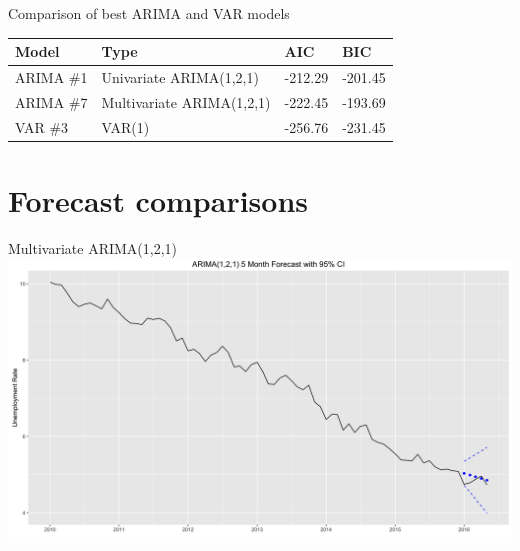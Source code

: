 \documentclass[ignorenonframetext]{beamer}
\begin{document}
  	\begin{frame}{Comparison of best ARIMA and VAR models}
\begin{table}[htb]
\begin{tabular}{llll}
  \hline
Model & Type & AIC & BIC \\ 
  \hline
ARIMA \#1 & Univariate ARIMA(1,2,1) &   -212.29 & -201.45  \\ 
ARIMA \#7 & Multivariate ARIMA(1,2,1)  & -222.45 & -193.69   \\ 
VAR \#3 & VAR(1) & -256.76 & -231.45 \\ 
   \hline
\end{tabular}
\end{table}
  	\end{frame}
 
 
 \section{Forecast comparisons}
 
  	\begin{frame}{Multivariate ARIMA(1,2,1)}
  		 \includegraphics[width=\linewidth]{images/ARIMApred}
  	\end{frame}
 
\end{document}
